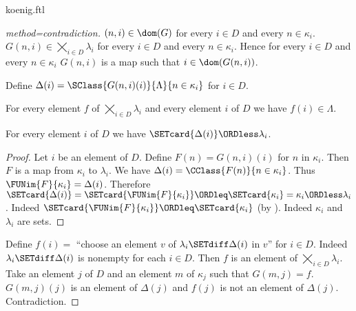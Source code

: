 \documentclass{stex}
\newcommand{\ProdSet}[2]{\bigtimes_{i \in #2} #1_{i}}
\begin{document}
\begin{smodule}{koenig.ftl}
\begin{forthel}
\begin{proof}[method=contradiction]
    $(n,i) \in \dom(G)$ for every $i \in D$ and every $n \in \kappa_{i}$.
    $G(n,i) \in \ProdSet{\lambda}{D}$ for every $i \in D$ and every $n \in \kappa_{i}$.
    Hence for every $i \in D$ and every $n \in \kappa_{i}$ $G(n,i)$ is a map such that $i \in \dom(G(n,i))$.

    Define $\Delta(i) = \SClass{G(n,i)(i)}{\Lambda}{n \in \kappa_{i}}$ for $i \in D$.

    For every element $f$ of $\ProdSet{\lambda}{D}$ and every element $i$ of $D$ we have $f(i) \in \Lambda$.

    For every element $i$ of $D$ we have $\SETcard{\Delta(i)} \ORDless \lambda_{i}$.
    \begin{proof}
      Let $i$ be an element of $D$.
      Define $F(n) = G(n,i)(i)$ for $n$ in $\kappa_{i}$.
      Then $F$ is a map from $\kappa_{i}$ to $\lambda_{i}$.
      We have $\Delta(i) = \CClass{F(n)}{n \in \kappa_{i}}$.
      Thus $\FUNim{F}{\kappa_{i}} = \Delta(i)$.
      Therefore $\SETcard{\Delta(i)}
        = \SETcard{\FUNim{F}{\kappa_{i}}}
        \ORDleq \SETcard{\kappa_{i}}
        = \kappa_{i}
        \ORDless \lambda_{i}$.
      Indeed $\SETcard{\FUNim{F}{\kappa_{i}}} \ORDleq \SETcard{\kappa_{i}}$ (by ).
      Indeed $\kappa_{i}$ and $\lambda_{i}$ are sets.
    \end{proof}

    Define $f(i) =$ ``choose an element $v$ of $\lambda_{i} \SETdiff \Delta(i)$ in $v$'' for $i \in D$.
    Indeed $\lambda_{i} \SETdiff \Delta(i)$ is nonempty for each $i \in D$.
    Then $f$ is an element of $\ProdSet{\lambda}{D}$.
    Take an element $j$ of $D$ and an element $m$ of $\kappa_{j}$ such that $G(m,j) = f$.
    $G(m,j)(j)$ is an element of $\Delta(j)$ and $f(j)$ is not an element of $\Delta(j)$.
    Contradiction.
  \end{proof}
\end{forthel}

\printbibliography
{}
\end{smodule}
\end{document}
